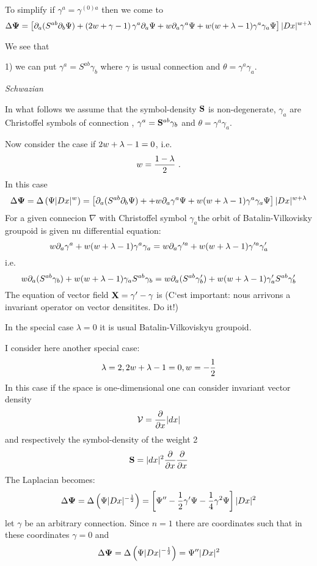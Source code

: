 To simplify if   $\gamma^a=\gamma^{(0)a}$ then we come to
              $$
 \Delta{\bf\Psi}=\left[\partial_a(S^{ab}\partial_b\Psi)+
             \left( 2w+\gamma-1\right)\gamma^a\partial_a\Psi+
                 w\partial_a\gamma^a\Psi+
            w(w+\lambda-1)\gamma^a\gamma_a
                \Psi \right]|Dx|^{w+\lambda}
              $$

We see that

1)  we can put $\gamma^a=S^{ab}\gamma_b$ where $\gamma$ is usual connection and
$\theta=\gamma^a\gamma_a$.

 \medskip

 {\it Schwazian}

In what follows we assume that the symbol-density ${\bf S}$ is non-degenerate,
$\gamma_a$ are Christoffel symbols of connection , $\gamma^a={\bf S}^{ab}\gamma_b$ and  $\theta=\gamma^a\gamma_a$.


 Now consider the case if $2w+\lambda-1=0$, i.e.
         $$
         w={1-\lambda\over 2}\,\,.
         $$
  In this case
        $$
        \Delta{\bf\Psi}=\Delta\left(\Psi|Dx|^w\right)=\left[\partial_a(S^{ab}\partial_b\Psi)+
                    +
                 w\partial_a\gamma^a\Psi+
            w(w+\lambda-1)\gamma^a\gamma_a
                 \Psi\right]|Dx|^{w+\lambda}
        $$
For a given connecion $\nabla$ with Christoffel symbol $\gamma_a$the orbit of Batalin-Vilkovisky groupoid is given nu differential equation:
             $$
          w\partial_a\gamma^a+
            w(w+\lambda-1)\gamma^a\gamma_a=w\partial_a\gamma'^a+
            w(w+\lambda-1)\gamma'^a\gamma'_a
             $$
i.e.
            $$
   w\partial_a(S^{ab}\gamma_b)+w(w+\lambda-1)\gamma_aS^{ab}\gamma_b=w\partial_a(S^{ab}\gamma'_b)+w(w+\lambda-1)\gamma'_aS^{ab}\gamma'_b
            $$
 The equation of vector field ${\bf X}=\gamma'-\gamma$ is
(C`est important: nous arrivons a invariant operator on vector densitites. Do it!)

In the special case $\lambda=0$ it is usual Batalin-Vilkoviskyu groupoid.

I consider here another special case:
     $$
     \lambda=2, 2w+\lambda-1=0, w=-{1\over 2}
     $$
In this case if the space is one-dimensional one can consider invariant vector density
        $$
      {\cal V}={\partial\over \partial x}|dx|
        $$
     and respectively the symbol-density of the weight 2
             $$
            {\bf S}=|dx|^2{\partial\over \partial x}{\partial\over \partial x}
              $$
The Laplacian becomes:
       $$
          \Delta{\bf\Psi}=
          \Delta\left(\Psi|Dx|^{-{1\over 2}}\right)=\left[\Psi''
                    -
                 {1\over 2}\gamma'\Psi
             -{1\over 4}\gamma^2
                 \Psi\right]|Dx|^2
       $$
let $\gamma$ be an arbitrary connection. Since $n=1$ there are coordinates such that
in these coordinates $\gamma=0$ and
 $$
 \Delta{\bf\Psi}=\Delta\left(\Psi|Dx|^{-{1\over 2}}\right)=\Psi''|Dx|^2
  $$


